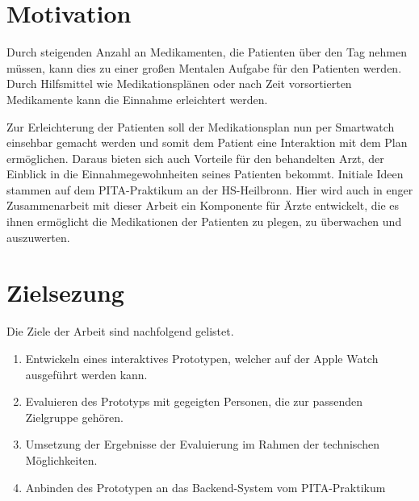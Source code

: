 \section{Motivation}
Durch steigenden Anzahl an Medikamenten, die Patienten über den Tag nehmen müssen, kann dies zu einer großen Mentalen Aufgabe für den Patienten werden. Durch Hilfsmittel wie Medikationsplänen oder nach Zeit vorsortierten Medikamente kann die Einnahme erleichtert werden. 

Zur Erleichterung der Patienten soll der Medikationsplan nun per Smartwatch einsehbar gemacht werden und somit dem Patient eine Interaktion mit dem Plan ermöglichen. Daraus bieten sich auch Vorteile für den behandelten Arzt, der Einblick in die Einnahmegewohnheiten seines Patienten bekommt. Initiale Ideen stammen auf dem PITA-Praktikum an der HS-Heilbronn. Hier wird auch in enger Zusammenarbeit mit dieser Arbeit ein Komponente für Ärzte entwickelt, die es ihnen ermöglicht die Medikationen der Patienten zu plegen, zu überwachen und auszuwerten.
\section{Zielsezung}
Die Ziele der Arbeit sind nachfolgend gelistet.

\begin{enumerate}
\item Entwickeln eines interaktives Prototypen, welcher auf der Apple Watch ausgeführt werden kann.
\item Evaluieren des Prototyps mit gegeigten Personen, die zur passenden Zielgruppe gehören.
\item Umsetzung der Ergebnisse der Evaluierung im Rahmen der technischen Möglichkeiten.
\item Anbinden des Prototypen an das Backend-System vom PITA-Praktikum
\end{enumerate}
